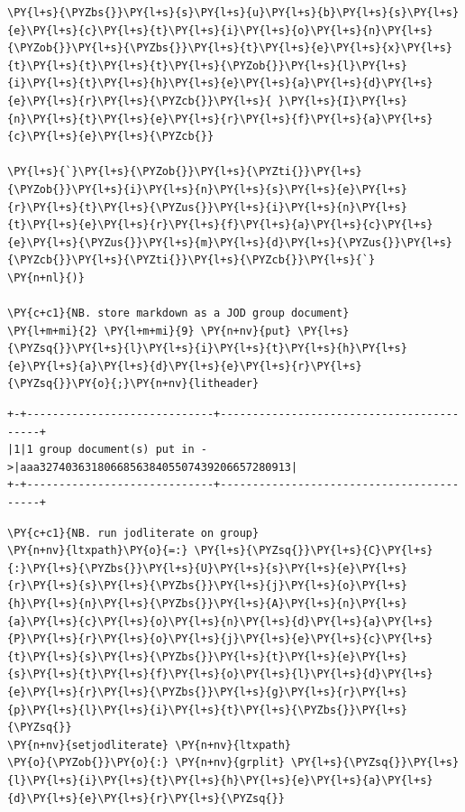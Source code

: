 \begin{tcolorbox}[breakable, size=fbox, boxrule=1pt, pad at break*=1mm,colback=cellbackground, colframe=cellborder]
\begin{Verbatim}[commandchars=\\\{\}]
\PY{l+s}{\PYZbs{}}\PY{l+s}{s}\PY{l+s}{u}\PY{l+s}{b}\PY{l+s}{s}\PY{l+s}{e}\PY{l+s}{c}\PY{l+s}{t}\PY{l+s}{i}\PY{l+s}{o}\PY{l+s}{n}\PY{l+s}{\PYZob{}}\PY{l+s}{\PYZbs{}}\PY{l+s}{t}\PY{l+s}{e}\PY{l+s}{x}\PY{l+s}{t}\PY{l+s}{t}\PY{l+s}{t}\PY{l+s}{\PYZob{}}\PY{l+s}{l}\PY{l+s}{i}\PY{l+s}{t}\PY{l+s}{h}\PY{l+s}{e}\PY{l+s}{a}\PY{l+s}{d}\PY{l+s}{e}\PY{l+s}{r}\PY{l+s}{\PYZcb{}}\PY{l+s}{ }\PY{l+s}{I}\PY{l+s}{n}\PY{l+s}{t}\PY{l+s}{e}\PY{l+s}{r}\PY{l+s}{f}\PY{l+s}{a}\PY{l+s}{c}\PY{l+s}{e}\PY{l+s}{\PYZcb{}}

\PY{l+s}{`}\PY{l+s}{\PYZob{}}\PY{l+s}{\PYZti{}}\PY{l+s}{\PYZob{}}\PY{l+s}{i}\PY{l+s}{n}\PY{l+s}{s}\PY{l+s}{e}\PY{l+s}{r}\PY{l+s}{t}\PY{l+s}{\PYZus{}}\PY{l+s}{i}\PY{l+s}{n}\PY{l+s}{t}\PY{l+s}{e}\PY{l+s}{r}\PY{l+s}{f}\PY{l+s}{a}\PY{l+s}{c}\PY{l+s}{e}\PY{l+s}{\PYZus{}}\PY{l+s}{m}\PY{l+s}{d}\PY{l+s}{\PYZus{}}\PY{l+s}{\PYZcb{}}\PY{l+s}{\PYZti{}}\PY{l+s}{\PYZcb{}}\PY{l+s}{`}
\PY{n+nl}{)}

\PY{c+c1}{NB. store markdown as a JOD group document}
\PY{l+m+mi}{2} \PY{l+m+mi}{9} \PY{n+nv}{put} \PY{l+s}{\PYZsq{}}\PY{l+s}{l}\PY{l+s}{i}\PY{l+s}{t}\PY{l+s}{h}\PY{l+s}{e}\PY{l+s}{a}\PY{l+s}{d}\PY{l+s}{e}\PY{l+s}{r}\PY{l+s}{\PYZsq{}}\PY{o}{;}\PY{n+nv}{litheader}
\end{Verbatim}
\end{tcolorbox}

    \begin{Verbatim}[commandchars=\\\{\}]
+-+-----------------------------+------------------------------------------+
|1|1 group document(s) put in ->|aaa327403631806685638405507439206657280913|
+-+-----------------------------+------------------------------------------+
    \end{Verbatim}

    \begin{tcolorbox}[breakable, size=fbox, boxrule=1pt, pad at break*=1mm,colback=cellbackground, colframe=cellborder]
\begin{Verbatim}[commandchars=\\\{\}]
\PY{c+c1}{NB. run jodliterate on group}
\PY{n+nv}{ltxpath}\PY{o}{=:} \PY{l+s}{\PYZsq{}}\PY{l+s}{C}\PY{l+s}{:}\PY{l+s}{\PYZbs{}}\PY{l+s}{U}\PY{l+s}{s}\PY{l+s}{e}\PY{l+s}{r}\PY{l+s}{s}\PY{l+s}{\PYZbs{}}\PY{l+s}{j}\PY{l+s}{o}\PY{l+s}{h}\PY{l+s}{n}\PY{l+s}{\PYZbs{}}\PY{l+s}{A}\PY{l+s}{n}\PY{l+s}{a}\PY{l+s}{c}\PY{l+s}{o}\PY{l+s}{n}\PY{l+s}{d}\PY{l+s}{a}\PY{l+s}{P}\PY{l+s}{r}\PY{l+s}{o}\PY{l+s}{j}\PY{l+s}{e}\PY{l+s}{c}\PY{l+s}{t}\PY{l+s}{s}\PY{l+s}{\PYZbs{}}\PY{l+s}{t}\PY{l+s}{e}\PY{l+s}{s}\PY{l+s}{t}\PY{l+s}{f}\PY{l+s}{o}\PY{l+s}{l}\PY{l+s}{d}\PY{l+s}{e}\PY{l+s}{r}\PY{l+s}{\PYZbs{}}\PY{l+s}{g}\PY{l+s}{r}\PY{l+s}{p}\PY{l+s}{l}\PY{l+s}{i}\PY{l+s}{t}\PY{l+s}{\PYZbs{}}\PY{l+s}{\PYZsq{}} 
\PY{n+nv}{setjodliterate} \PY{n+nv}{ltxpath}
\PY{o}{\PYZob{}}\PY{o}{:} \PY{n+nv}{grplit} \PY{l+s}{\PYZsq{}}\PY{l+s}{l}\PY{l+s}{i}\PY{l+s}{t}\PY{l+s}{h}\PY{l+s}{e}\PY{l+s}{a}\PY{l+s}{d}\PY{l+s}{e}\PY{l+s}{r}\PY{l+s}{\PYZsq{}}
\end{Verbatim}
\end{tcolorbox}

